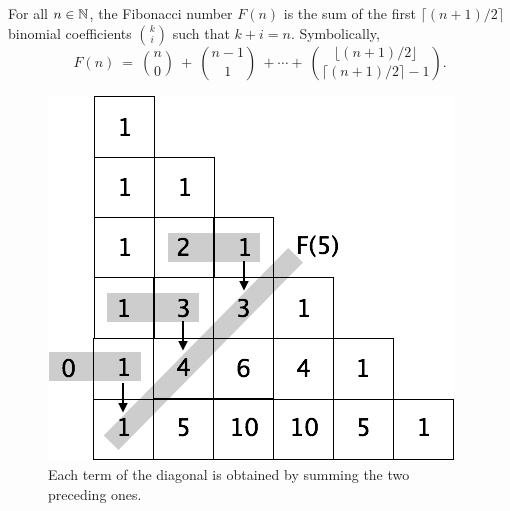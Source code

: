 \begin{prop}
\label{thm:FibNo+BinomCoeff}
For all $n \in \mathbb{N}$, the Fibonacci number $F(n)$ is the sum of the
first $\lceil (n+1)/2 \rceil$ binomial coefficients $\displaystyle {k
  \choose i}$ such that $k+i = n$.  Symbolically,
\begin{equation}
\label{eq:FibNo+BinomCoeff}
F(n) \ = \ {n \choose 0} \ + \ {{n-1} \choose 1} \ + \cdots + \ 
{{\lfloor (n+1)/2 \rfloor} \choose {\lceil (n+1)/2 \rceil -1}}.
\end{equation}
\end{prop}

\begin{figure}[htb]
\begin{center}
        \includegraphics[scale=0.3]{FiguresMaths//FiboPascal2}
\caption{Each term of the diagonal is obtained by summing the two preceding ones.}
        \label{fig:FiboPascalExplanation}
\end{center}
\end{figure}


